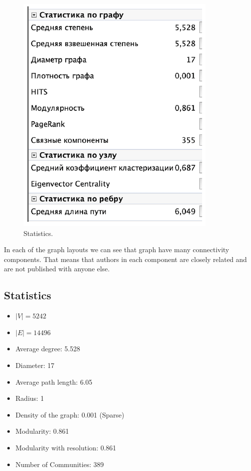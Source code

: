 \documentclass[a4paper,article,14pt]{extarticle}
\begin{document}
	\begin{figure}[h!]
		\centering
		\includegraphics[scale=0.35]{statistic.png}
		\caption{Statistics.}
		\label{stat}
	\end{figure} 

	In each of the graph layouts we can see that graph have many connectivity components. That means that authors in each component are closely related and are not published with anyone else.
	
	\subsection{Statistics}
	
	\begin{itemize}
		\item $|V|=5242$
		\item $|E|=14496$
		\item Average degree: 5.528
		\item Diameter: 17
		\item Average path length: 6.05
		\item Radius: 1
		\item Density of the graph: 0.001 (Sparse)
		\item Modularity: 0.861
		\item Modularity with resolution: 0.861
		\item Number of Communities: 389
	\end{itemize}
\end{document}

